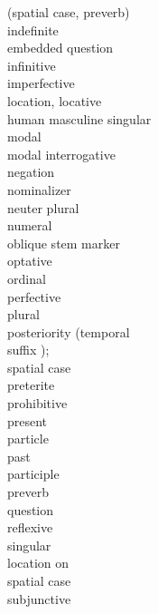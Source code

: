 \begin{multicols}{2}
\begin{tabbing}
			{}		\>	(spatial case, preverb)\\
				\>	indefinite\\
				\>	embedded question\\
				\>	infinitive\\
				\>	imperfective\\
				\>	location, locative\\
				\>	human masculine singular\\
				\>	modal\\
				\>	modal interrogative\\
				\>	negation\\
				\>	nominalizer\\
				\>	neuter plural\\
				\>	numeral\\
				\>	oblique stem marker\\
				\>	optative\\
				\>	ordinal\\
				\>	perfective\\
				\>	plural\\
				\>	posteriority (temporal \\
			{}		\>	    suffix );\\
			{}		\>	    spatial case  \\
				\>	preterite\\
				\>	prohibitive\\
				\>	present\\
				\>	particle\\
				\>	past\\
				\>	participle\\
				\>	preverb\\
				\>	question\\
				\>	reflexive\\
				\>	singular\\
				\>	location on\\
				\>	spatial case \\
				\>	subjunctive
		\end{tabbing}
	\end{multicols}


